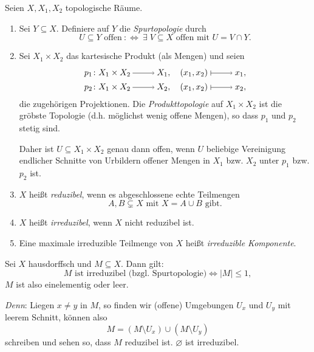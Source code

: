 \documentclass[a4paper,12pt,index=toc]{scrbook}
\theoremstyle{keinenummern} %
\newcommand{\leer}{\ensuremath{\varnothing}}
\newcommand{\card}[1]{|#1|}
\begin{document}
\begin{de}\label{1.2.6} Seien $X,X_{1},X_{2}$ topologische Räume.
\begin{enumerate}
\item Sei $Y\subseteq X$. Definiere auf $Y$ die \emph{Spurtopologie} durch
\begin{equation*}U\subseteq Y\text{ offen}\: :\Longleftrightarrow\:\exists\;V\subseteq X\text{ offen mit }U=V\cap Y.\end{equation*}
\item Sei $X_{1}\times X_{2}$ das kartesische Produkt (als Mengen) und seien
\begin{align*}p_{1}\colon X_{1}\times X_{2}\ra X_{1},\quad(x_{1},x_{2})\mapsto x_{1},\\p_{2}\colon X_{1}\times X_{2}\ra X_{2},\quad(x_{1},x_{2})\mapsto x_{2},\end{align*}
die zugehörigen Projektionen. Die \emph{Produkttopologie} auf $X_{1}\times X_{2}$ ist die gröbste Topologie (d.h. möglichst wenig offene Mengen), so dass $p_{1}$ und $p_{2}$ stetig sind.

Daher ist $U\subseteq X_{1}\times X_{2}$ genau dann offen, wenn $U$ beliebige Vereinigung endlicher Schnitte von Urbildern offener Mengen in $X_{1}$ bzw. $X_{2}$ unter $p_{1}$ bzw. $p_{2}$ ist.

\item $X$ heißt \emph{reduzibel}, wenn es abgeschlossene echte Teilmengen \begin{equation*}A,B\subsetneq X\text{ mit }X=A\cup B\text{ gibt.}\end{equation*}

\item $X$ heißt \emph{irreduzibel}, wenn $X$ nicht reduzibel ist.

\item Eine maximale irreduzible Teilmenge von $X$ heißt \emph{irreduzible Komponente}.
\end{enumerate}\end{de}

\begin{bsp}\label{1.2.7}
Sei $X$ hausdorffsch und $M\subseteq X$. Dann gilt:
\begin{equation*}M\text{ ist irreduzibel (bzgl. Spurtopologie)}\iff \card{M}\leq 1,\end{equation*}
$M$ ist also einelementig oder leer.

\textit{Denn}: Liegen $x\neq y$ in $M$, so finden wir (offene) Umgebungen $U_{x}$ und $U_{y}$ mit leerem Schnitt, können also
\begin{equation*}M=(M\setminus U_{x})\cup(M\setminus U_{y})\end{equation*}
schreiben und sehen so, dass $M$ reduzibel ist. $\leer$ ist irreduzibel.
\end{bsp}
\end{document}
